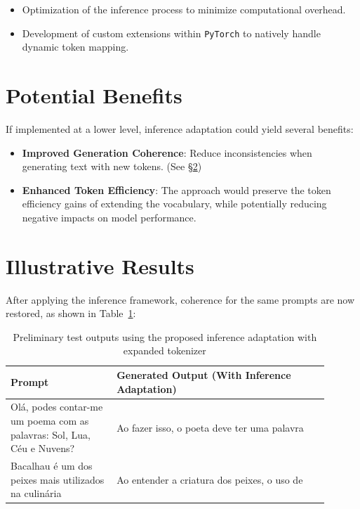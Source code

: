 \begin{itemize}
    \item Optimization of the inference process to minimize computational overhead.
    \item Development of custom extensions within \texttt{PyTorch} to natively handle dynamic token mapping.
\end{itemize}

\section{Potential Benefits}
If implemented at a lower level, inference adaptation could yield several benefits:

\begin{itemize}
    \item \textbf{Improved Generation Coherence}: Reduce inconsistencies when generating text with new tokens. (See \S\ref{sec:results_new_inference})
 
    \item \textbf{Enhanced Token Efficiency}: The approach would preserve the token efficiency
gains of extending the vocabulary, while potentially reducing negative impacts on model performance.

\end{itemize}

\section{Illustrative Results}
\label{sec:results_new_inference}
After applying the inference framework, coherence for the same prompts are now restored, as shown in Table~\ref{tab:adapted-inference-results}:

\begin{table}[H]
    \centering
    \begin{tabular}{|p{0.3\linewidth}|p{0.6\linewidth}|}
        \hline
        \textbf{Prompt} & \textbf{Generated Output (With Inference Adaptation)} \\
        \hline
        Olá, podes contar-me um poema com as palavras: Sol, Lua, Céu e Nuvens? & Ao fazer isso, o poeta deve ter uma palavra \\
        \hline
        Bacalhau é um dos peixes mais utilizados na culinária & Ao entender a criatura dos peixes, o uso de \\
        \hline
    \end{tabular}
    \caption{Preliminary test outputs using the proposed inference adaptation with expanded tokenizer}
    \label{tab:adapted-inference-results}
\end{table}


